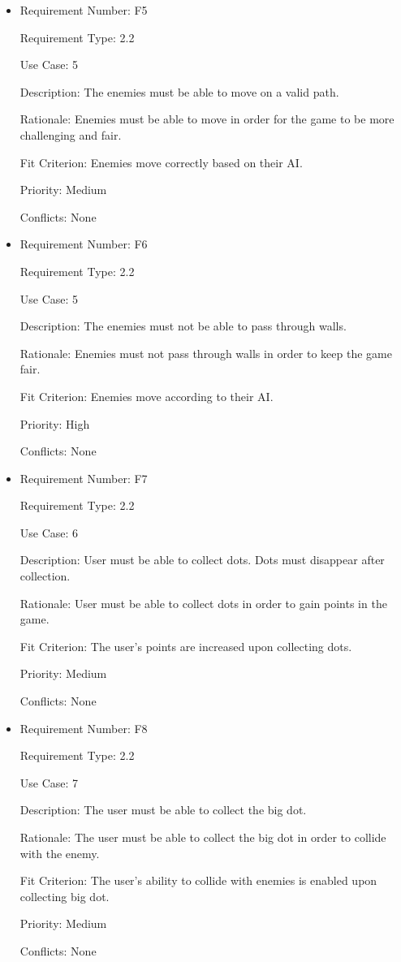 \documentclass[12pt, titlepage]{article}
\begin{document}
\begin{itemize}
\item
Requirement Number: F5

Requirement Type: 2.2

Use Case: 5

Description: The enemies must be able to move on a valid path.

Rationale: Enemies must be able to move in order for the game to be more challenging and fair.

Fit Criterion: Enemies move correctly based on their AI.

Priority: Medium

Conflicts: None
\end{itemize}

\begin{itemize}
\item
Requirement Number: F6

Requirement Type: 2.2

Use Case: 5

Description: The enemies must not be able to pass through walls.

Rationale: Enemies must not pass through walls in order to keep the game fair.

Fit Criterion: Enemies move according to their AI.

Priority: High

Conflicts: None
\end{itemize}

\begin{itemize}
\item
Requirement Number: F7

Requirement Type: 2.2

Use Case: 6

Description: User must be able to collect dots. Dots must disappear after collection.

Rationale: User must be able to collect dots in order to gain points in the game.

Fit Criterion: The user's points are increased upon collecting dots.

Priority: Medium

Conflicts: None
\end{itemize}

\begin{itemize}
\item
Requirement Number: F8

Requirement Type: 2.2

Use Case: 7

Description: The user must be able to collect the big dot.

Rationale: The user must be able to collect the big dot in order to collide with the enemy.

Fit Criterion: The user's ability to collide with enemies is enabled upon collecting big dot.

Priority: Medium

Conflicts: None
\end{itemize}
\end{document}

